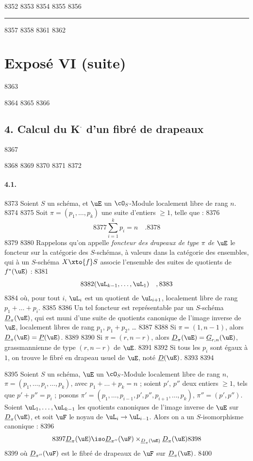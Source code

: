   8352	\setcounter{page}{401}
  8353	
  8354	\thispagestyle{fancy}
  8355	
  8356	\noindent\rule{\textwidth}{0.5pt}
  8357	
  8358			
  8361	%
  8362	\section*{Expos\'e VI (suite)}
  8363	
  8364	
  8365	%
  8366	\subsection*{4. Calcul du K$^{\boldsymbol{\cdot}}$ d'un fibr\'e de drapeaux}
  8367	
  8368	
  8369	\setcounter{section}{4}
  8370	\setcounter{subsection}{0}
  8371	
  8372	\paragraph{4.1.}
  8373	Soient $S$ un sch\'ema, et $\uE$ un $\cO_S$-Module localement libre de rang $n$.
  8374	
  8375	Soit $\pi = (p_1,\dots,p_k)$ une suite d'entiers $\geq 1$, telle que :
  8376	\[
  8377	\sum_{i=1}^{k} p_i = n \quad .
  8378	\]
  8379	
  8380	Rappelons qu'on appelle \emph{foncteur des drapeaux de type $\pi$ de $\uE$} le foncteur sur la cat\'egorie des $S$-sch\'emas, \`a valeurs dans la cat\'egorie des ensembles, qui \`a un $S$-sch\'ema $X \xto{f} S$ associe l'ensemble des suites de quotients de $f^{*}(\uE)$ :
  8381	\[
  8382	(\uL_{k-1},\dots,\uL_1) \quad ,
  8383	\]
  8384	o\`u, pour tout $i$, $\uL_i$ est un quotient de $\uL_{i+1}$, localement libre de rang $p_1+\dots+p_i$.
  8385	
  8386	Un tel foncteur est repr\'esentable par un $S$-sch\'ema $\underline{D}_{\pi}(\uE)$, qui est muni d'une suite de quotients canonique de l'image inverse de $\uE$, localement libres de rang $p_1$, $p_1+p_2$, \dots
  8387	
  8388	Si $\pi = (1,n-1)$, alors $\underline{D}_{\pi}(\uE) = \underline{P}(\uE)$.
  8389	
  8390	Si $\pi = (r,n-r)$, alors $\underline{D}_{\pi}(\uE) = \underline{G}_{r,n}(\uE)$, grassmannienne de type $(r,n-r)$ de $\uE$.
  8391	
  8392	Si tous les $p_i$ sont \'egaux \`a $1$, on trouve le fibr\'e en drapeau usuel de $\uE$, not\'e $\underline{D}(\uE)$.
  8393	
  8394	\begin{lemme}[4.2]
  8395	Soient $S$ un sch\'ema, $\uE$ un $\cO_S$-Module localement libre de rang $n$, $\pi = (p_1,\dots,p_i,\dots,p_k)$, avec $p_1+\dots+p_k = n$ ; soient $p'$, $p''$ deux entiers $\geq 1$, tels que $p'+p'' = p_i$ ; posons $\pi' = (p_1,\dots,p_{i-1},p',p'',p_{i+1},\dots,p_k)$, $\pi'' = (p',p'')$. Soient $\uL_1,\dots,\uL_{k-1}$ les quotients canoniques de l'image inverse de $\uE$ sur $\underline{D}_{\pi}(\uE)$, et soit $\uF$ le noyau de $\uL_i \to \uL_{i-1}$. Alors on a un $S$-isomorphisme canonique :
  8396	\[
  8397	\underline{D}_{\pi}(\uE) \iso \underline{D}_{\pi''}(\uF) \times_{\underline{D}_{\pi}(\uE)} \underline{D}_{\pi}(\uE)
  8398	\]
  8399	o\`u $\underline{D}_{\pi''}(\uF)$ est le fibr\'e de drapeaux de $\uF$ sur $\underline{D}_{\pi}(\uE)$.
  8400	\end{lemme}
